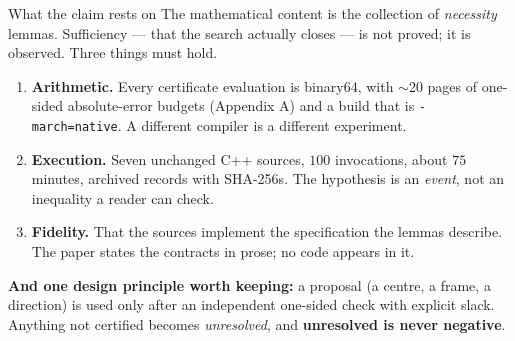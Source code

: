 \documentclass[aspectratio=169,10pt]{beamer}
\begin{document}
\begin{frame}{What the claim rests on}
  \small
  The mathematical content is the collection of \emph{necessity} lemmas. Sufficiency --- that the
  search actually closes --- is not proved; it is observed. Three things must hold.
  \medskip

  \begin{enumerate}
    \item \textbf{Arithmetic.} Every certificate evaluation is binary64, with $\sim$20 pages of
          one-sided absolute-error budgets (Appendix A) and a build that is \texttt{-march=native}.
          A different compiler is a different experiment.
    \item \textbf{Execution.} Seven unchanged C++ sources, $100$ invocations, about $75$ minutes,
          archived records with SHA-256s. The hypothesis is an \emph{event}, not an inequality a
          reader can check.
    \item \textbf{Fidelity.} That the sources implement the specification the lemmas describe.
          The paper states the contracts in prose; no code appears in it.
  \end{enumerate}
  \vspace{2mm}
  {\color{acc}\textbf{And one design principle worth keeping:}} a proposal (a centre, a frame, a
  direction) is used only after an independent one-sided check with explicit slack. Anything not
  certified becomes \emph{unresolved}, and \textbf{unresolved is never negative}.
\end{frame}
\end{document}
